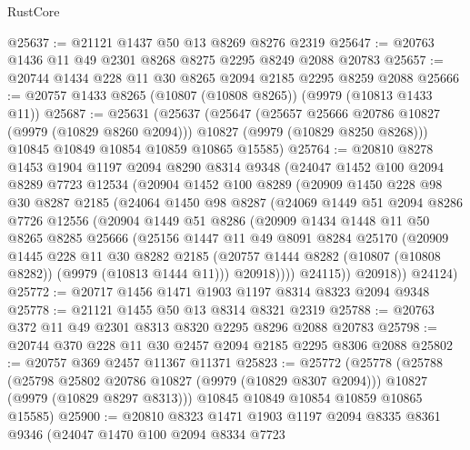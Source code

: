 \begin{lexlean}{RustCore}
\begin{coremodule}
@25637 := @21121 @1437 @50 @13 @8269 @8276 @2319
@25647 := @20763 @1436 @11 @49 @2301 @8268 @8275 @2295 @8249 @2088 @20783
@25657 := @20744 @1434 @228 @11 @30 @8265 @2094 @2185 @2295 @8259 @2088
@25666 := @20757 @1433 @8265 (@10807 (@10808 @8265)) (@9979 (@10813 @1433 @11))
@25687 := @25631
    (@25637
      (@25647
        (@25657 @25666 @20786 @10827 (@9979 (@10829 @8260 @2094)))
        @10827
        (@9979 (@10829 @8250 @8268)))
      @10845
      @10849
      @10854
      @10859
      @10865
      @15585)
@25764 := @20810
    @8278
    @1453
    @1904
    @1197
    @2094
    @8290
    @8314
    @9348
    (@24047
      @1452
      @100
      @2094
      @8289
      @7723
      @12534
      (@20904
        @1452
        @100
        @8289
        (@20909
          @1450
          @228
          @98
          @30
          @8287
          @2185
          (@24064
            @1450
            @98
            @8287
            (@24069
              @1449
              @51
              @2094
              @8286
              @7726
              @12556
              (@20904
                @1449
                @51
                @8286
                (@20909
                  @1434
                  @1448
                  @11
                  @50
                  @8265
                  @8285
                  @25666
                  (@25156
                    @1447
                    @11
                    @49
                    @8091
                    @8284
                    @25170
                    (@20909
                      @1445
                      @228
                      @11
                      @30
                      @8282
                      @2185
                      (@20757 @1444 @8282 (@10807 (@10808 @8282)) (@9979 (@10813 @1444 @11)))
                      @20918))))
              @24115))
          @20918))
      @24124)
@25772 := @20717 @1456 @1471 @1903 @1197 @8314 @8323 @2094 @9348
@25778 := @21121 @1455 @50 @13 @8314 @8321 @2319
@25788 := @20763 @372 @11 @49 @2301 @8313 @8320 @2295 @8296 @2088 @20783
@25798 := @20744 @370 @228 @11 @30 @2457 @2094 @2185 @2295 @8306 @2088
@25802 := @20757 @369 @2457 @11367 @11371
@25823 := @25772
    (@25778
      (@25788
        (@25798 @25802 @20786 @10827 (@9979 (@10829 @8307 @2094)))
        @10827
        (@9979 (@10829 @8297 @8313)))
      @10845
      @10849
      @10854
      @10859
      @10865
      @15585)
@25900 := @20810
    @8323
    @1471
    @1903
    @1197
    @2094
    @8335
    @8361
    @9346
    (@24047
      @1470
      @100
      @2094
      @8334
      @7723

\end{coremodule}
\end{lexlean}

